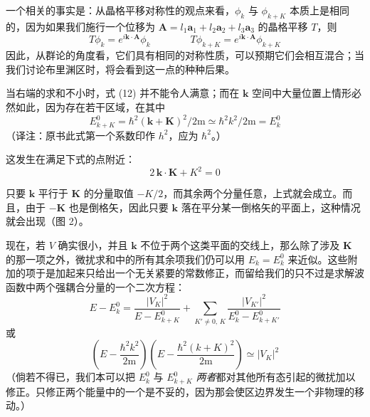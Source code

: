 一个相关的事实是：从晶格平移对称性的观点来看，$\phi_k$ 与 $\phi_{k+K}$ 本质上是相同的，因为如果我们施行一个位移为 $\mathbf{A} = l_1\mathbf{a}_1 + l_2\mathbf{a}_2 + l_3\mathbf{a}_3$ 的晶格平移 $T$，则
\begin{equation*}
T\phi_k = e^{i\mathbf{k}\cdot\mathbf{A}}\phi_k \qquad\qquad T\phi_{k+K} = e^{i\mathbf{k}\cdot\mathbf{A}}\phi_{k+K}
\end{equation*}
因此，从群论的角度看，它们具有相同的对称性质，可以预期它们会相互混合；当我们讨论布里渊区时，将会看到这一点的种种后果。

当右端的求和不小时，式 (12) 并不能令人满意；而在 $\mathbf{k}$ 空间中大量位置上情形必然如此，因为存在若干区域，在其中
\begin{equation*}
E_{k+K}^{0} = \hbar^2(\mathbf{k}+\mathbf{K})^2/2\mathrm{m} \simeq \hbar^2 k^2/2\mathrm{m} = E_k^{0}
\end{equation*}
（译注：原书此式第一个系数印作 $h^2$，应为 $\hbar^2$。）

这发生在满足下式的点附近：
\begin{equation*}
2\,\mathbf{k}\cdot\mathbf{K} + K^2 = 0
\end{equation*}

只要 $\mathbf{k}$ 平行于 $\mathbf{K}$ 的分量取值 $-K/2$，而其余两个分量任意，上式就会成立。而且，由于 $-\mathbf{K}$ 也是倒格矢，因此只要 $\mathbf{k}$ 落在平分某一倒格矢的平面上，这种情况就会出现（图 2）。


现在，若 $V$ 确实很小，并且 $\mathbf{k}$ 不位于两个这类平面的交线上，那么除了涉及 $\mathbf{K}$ 的那一项之外，微扰求和中的所有其余项我们仍可以用 $E_k = E_k^{0}$ 来近似。这些附加的项于是加起来只给出一个无关紧要的常数修正，而留给我们的只不过是求解波函数中两个强耦合分量的一个二次方程：
\begin{equation*}
E - E_k^{0} = \frac{|V_K|^{2}}{E - E_{k+K}^{0}} + \sum_{K'\neq 0,\,K} \frac{|V_{K'}|^{2}}{E_k^{0} - E_{k+K'}^{0}}
\end{equation*}
或
\begin{equation*}
\left(E - \frac{\hbar^2 k^2}{2\mathrm{m}}\right)\left(E - \frac{\hbar^2 (k+K)^2}{2\mathrm{m}}\right) \simeq |V_K|^{2}
\end{equation*}
（倘若不得已，我们本可以把 $E_k^{0}$ 与 $E_{k+K}^{0}$ \emph{两者}都对其他所有态引起的微扰加以修正。只修正两个能量中的一个是不妥的，因为那会使区边界发生一个非物理的移动。）

